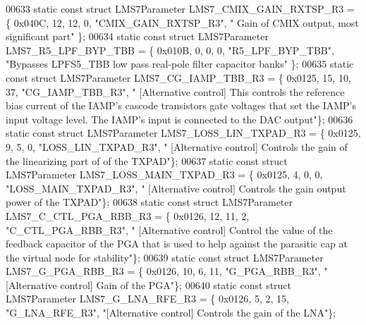 \begin{DoxyCode}
00633 \textcolor{keyword}{static} \textcolor{keyword}{const} \textcolor{keyword}{struct }LMS7Parameter LMS7_CMIX_GAIN_RXTSP_R3 = \{ 0x040C, 12, 12, 0, \textcolor{stringliteral}{"CMIX\_GAIN\_RXTSP\_R3"}, \textcolor{stringliteral}{"
      Gain of CMIX output, most significant part"} \};
00634 \textcolor{keyword}{static} \textcolor{keyword}{const} \textcolor{keyword}{struct }LMS7Parameter LMS7_R5_LPF_BYP_TBB = \{ 0x010B, 0, 0, 0, \textcolor{stringliteral}{"R5\_LPF\_BYP\_TBB"}, \textcolor{stringliteral}{"Bypasses
       LPFS5\_TBB low pass real-pole filter capacitor banks"} \};
00635 \textcolor{keyword}{static} \textcolor{keyword}{const} \textcolor{keyword}{struct }LMS7Parameter LMS7_CG_IAMP_TBB_R3 = \{ 0x0125, 15, 10, 37, \textcolor{stringliteral}{"CG\_IAMP\_TBB\_R3"}, \textcolor{stringliteral}{"
      [Alternative control] This controls the reference bias current of the IAMP's cascode transistors gate voltages that
       set the IAMP's input voltage level. The IAMP's input is connected to the DAC output"}\};
00636 \textcolor{keyword}{static} \textcolor{keyword}{const} \textcolor{keyword}{struct }LMS7Parameter LMS7_LOSS_LIN_TXPAD_R3 = \{ 0x0125, 9, 5, 0, \textcolor{stringliteral}{"LOSS\_LIN\_TXPAD\_R3"}, \textcolor{stringliteral}{"
      [Alternative control] Controls the gain of the linearizing part of of the TXPAD"}\};
00637 \textcolor{keyword}{static} \textcolor{keyword}{const} \textcolor{keyword}{struct }LMS7Parameter LMS7_LOSS_MAIN_TXPAD_R3 = \{ 0x0125, 4, 0, 0, \textcolor{stringliteral}{"LOSS\_MAIN\_TXPAD\_R3"}, \textcolor{stringliteral}{"
      [Alternative control] Controls the gain  output power of the TXPAD"}\};
00638 \textcolor{keyword}{static} \textcolor{keyword}{const} \textcolor{keyword}{struct }LMS7Parameter LMS7_C_CTL_PGA_RBB_R3 = \{ 0x0126, 12, 11, 2, \textcolor{stringliteral}{"C\_CTL\_PGA\_RBB\_R3"}, \textcolor{stringliteral}{"
      [Alternative control] Control the value of the feedback capacitor of the PGA that is used to help against the
       parasitic cap at the virtual node for stability"}\};
00639 \textcolor{keyword}{static} \textcolor{keyword}{const} \textcolor{keyword}{struct }LMS7Parameter LMS7_G_PGA_RBB_R3 = \{ 0x0126, 10, 6, 11, \textcolor{stringliteral}{"G\_PGA\_RBB\_R3"}, \textcolor{stringliteral}{"[Alternative
       control] Gain of the PGA"}\};
00640 \textcolor{keyword}{static} \textcolor{keyword}{const} \textcolor{keyword}{struct }LMS7Parameter LMS7_G_LNA_RFE_R3 = \{ 0x0126, 5, 2, 15, \textcolor{stringliteral}{"G\_LNA\_RFE\_R3"}, \textcolor{stringliteral}{"[Alternative
       control] Controls the gain of the LNA"}\};

\end{DoxyCode}
